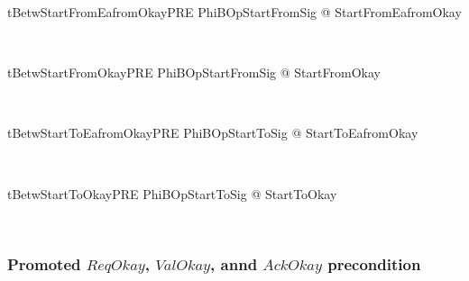 \begin{LNewThm}
\begin{theorem}{tBetwStartFromEafromOkayPRE}
   \forall PhiBOpStartFromSig @ \pre StartFromEafromOkay
\end{theorem}~\end{LNewThm}

\begin{LNewThm}
\begin{theorem}{tBetwStartFromOkayPRE}
   \forall PhiBOpStartFromSig @ \pre StartFromOkay
\end{theorem}~\end{LNewThm}

\begin{LNewThm}
\begin{theorem}{tBetwStartToEafromOkayPRE}
   \forall PhiBOpStartToSig @ \pre StartToEafromOkay
\end{theorem}~\end{LNewThm}

\begin{LNewThm}
\begin{theorem}{tBetwStartToOkayPRE}
   \forall PhiBOpStartToSig @ \pre StartToOkay
\end{theorem}~\end{LNewThm}

\newpage

\subsubsection{Promoted $ReqOkay$, $ValOkay$, annd $AckOkay$ precondition}

